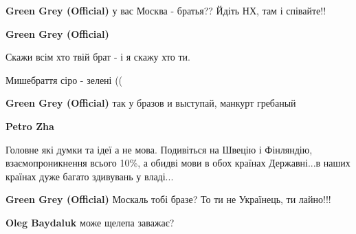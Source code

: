 \begin{itemize}
\begin{itemize}
\begin{itemize}
\textbf{Green Grey (Official)} у вас Москва - братья?? Йдіть НХ, там і співайте!!

 
\textbf{Green Grey (Official)}

Скажи всім хто твій брат - і я скажу хто ти.

Мишебраття сіро - зелені ((

 
\textbf{Green Grey (Official)} так у бразов и выступай, манкурт гребаный


\textbf{Petro Zha} 

Головне які думки та ідеї а не мова. Подивіться на Швецію і Фінляндію,
взаємопроникнення всього 10\%, а обидві мови в обох країнах Державні...в наших
країнах дуже багато здивувань у владі...

 
\textbf{Green Grey (Official)} Москаль тобі бразе? То ти не Українець, ти лайно!!!

 
\textbf{Oleg Baydaluk} може щелепа заважає?

 

\end{itemize}
\end{itemize}
\end{itemize}
